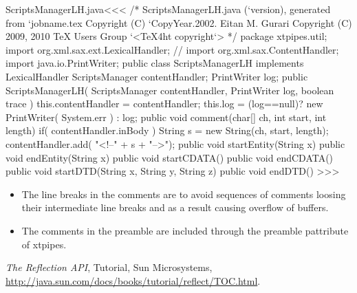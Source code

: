 \documentclass{article}
\begin{document}
\<ScriptsManagerLH.java\><<<
/* ScriptsManagerLH.java (`version), generated from `jobname.tex
   Copyright (C) `CopyYear.2002. Eitan M. Gurari
   Copyright (C) 2009, 2010 TeX Users Group
`<TeX4ht copyright`> */
package xtpipes.util;
import org.xml.sax.ext.LexicalHandler;
// import org.xml.sax.ContentHandler;
import java.io.PrintWriter;
public class ScriptsManagerLH implements LexicalHandler {
       ScriptsManager contentHandler;
       PrintWriter log;
   public ScriptsManagerLH( ScriptsManager contentHandler,
                          PrintWriter log, boolean trace ){
     this.contentHandler = contentHandler;
     this.log = (log==null)? new PrintWriter( System.err ) : log;
   }
   public void comment(char[] ch, int start, int length){
     if( contentHandler.inBody ){
        String s = new String(ch, start, length);
        contentHandler.add(  "<!--" + s + "\n-->");
   } }
   public void startEntity(String x){}
   public void endEntity(String x){}
   public void startCDATA(){}
   public void endCDATA(){}
   public void startDTD(String x, String y, String z){}
   public void endDTD(){}
}
>>>

\begin{itemize}
\item
The line breaks in the comments are to avoid sequences of comments
loosing their intermediate line breaks and as a result causing
overflow of buffers.

\item The comments in the preamble are included through the
preamble pattribute of xtpipes.
\end{itemize}











\begin{thebibliography}{10}
{\sl The Reflection API},
Tutorial, Sun Microsystems,
\url{http://java.sun.com/docs/books/tutorial/reflect/TOC.html}.
\end{thebibliography}





{
}
{ 
}
\end{document}
